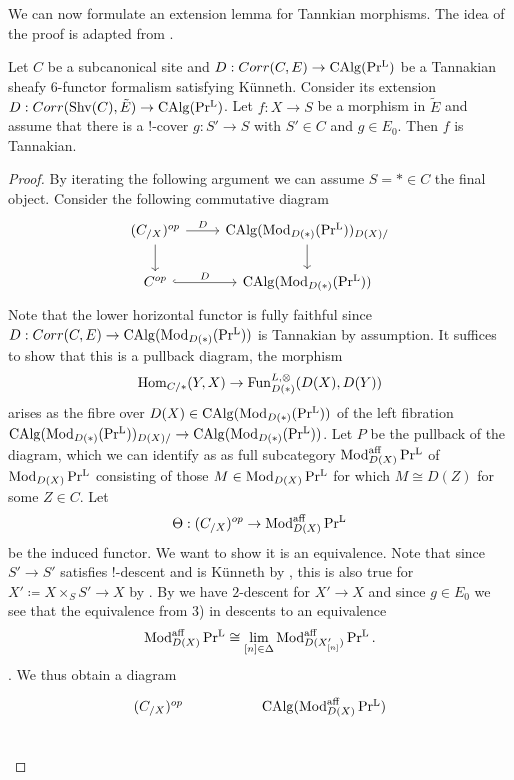 We can now formulate an extension lemma for Tannkian morphisms. The idea of the proof is adapted from \Cite[Theorem 4.2.1]{stefanich2023tannaka}.
\begin{theorem}\label{tannakian lift}
    Let $C$ be a subcanonical site and $D: Corr(C,E)\to \operatorname{CAlg}(\operatorname{Pr^{L}})$ be a Tannakian sheafy $6$-functor formalism satisfying Künneth. Consider its extension $D: Corr(\operatorname{Shv}(C),\tilde{E})\to \operatorname{CAlg}(\operatorname{Pr^{L}})$. Let $f: X \to S$ be a morphism in $\tilde{E}$ and assume that there is a $!$-cover $g: S'\to S$ with $S'\in C$ and $g\in E_0$. Then $f$ is Tannakian.
\end{theorem}
\begin{proof}
  By iterating the following argument we can assume $S= \ast \in C$ the final object.  Consider the following commutative diagram 
\[\begin{tikzcd}
	{(C_{/X})^{op}} & {\CAlg(\Mod_{D(\ast)}(\PrL))_{D(X)/}} \\
	{C^{op}} & {\CAlg(\Mod_{D(\ast)}(\PrL))}
	\arrow["D", from=1-1, to=1-2]
	\arrow[from=1-1, to=2-1]
	\arrow[from=1-2, to=2-2]
	\arrow["D", hook, from=2-1, to=2-2]
\end{tikzcd}\]
Note that the lower horizontal functor is fully faithful since  $D: Corr(C,E)\to \operatorname{CAlg}(\operatorname{Mod}_{D(\ast)}(\operatorname{Pr^{L}}))$ is Tannakian by assumption. It suffices to show that this is a pullback diagram, the morphism 
\[
\text{Hom}_{C/\ast}(Y,X) \to \operatorname{Fun}_{D(\ast)}^{L,\otimes}(D(X),D(Y))
\]
arises as the fibre over $D(X) \in \operatorname{CAlg}(\operatorname{Mod}_{D(\ast)}(\operatorname{Pr^{L}}))$ of the left fibration $\operatorname{CAlg}(\operatorname{Mod}_{D(\ast)}(\operatorname{Pr^{L}}))_{D(X)/}\to \operatorname{CAlg}(\operatorname{Mod}_{D(\ast)}(\operatorname{Pr^{L}}))$.
Let $P$ be the pullback of the diagram, which we can identify as as full subcategory $\operatorname{Mod}_{D(X)}^{\text{aff}}\operatorname{Pr^{L}}$ of $\operatorname{Mod}_{D(X)}\operatorname{Pr^{L}}$ consisting of those $M\in \operatorname{Mod}_{D(X)}\operatorname{Pr^{L}} $ for which $M\cong D(Z)$ for some $Z\in C$. Let 
\[
\Theta : (C_{/X})^{op} \to  \operatorname{Mod}_{D(X)}^{\text{aff}}\operatorname{Pr^{L}}
\]
be the induced functor. We want to show it is an equivalence. Note that since $S' \to S'$ satisfies $!$-descent and is Künneth by , this is also true for $X'\coloneqq X\times_S S' \to X$ by . By  we have $2$-descent for $X' \to X$ and since $g\in E_0$ we see that the equivalence from 3) in  descents to an equivalence 
\[
\operatorname{Mod}_{D(X)}^{\text{aff}}\operatorname{Pr^{L}} \cong \lim_{[n]\in \Delta} \operatorname{Mod}_{D(X'_{[n]})}^{\text{aff}}\operatorname{Pr^{L}}.
\].
We thus obtain a diagram 
\[\begin{tikzcd}
	{(C_{/X})^{op}} && {\CAlg(\Mod_{D(X)}^{\text{aff}}\PrL)} \\

\end{tikzcd}\]
\end{proof}
